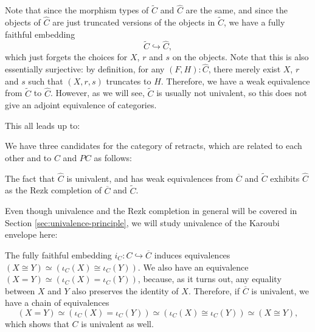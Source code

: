 \begin{remark}
  Note that since the morphism types of $ \tilde C $ and $ \hat C $ are the same, and since the objects of $ \hat C $ are just truncated versions of the objects in $ \tilde C $, we have a fully faithful embedding
  \[ \tilde C \hookrightarrow \hat C, \]
  which just forgets the choices for $ X $, $ r $ and $ s $ on the objects. Note that this is also essentially surjective: by definition, for any $ (F, H) : \hat C $, there merely exist $ X $, $ r $ and $ s $ such that $ (X, r, s) $ truncates to $ H $.
  Therefore, we have a weak equivalence from $ \tilde C $ to $ \hat C $. However, as we will see, $ \tilde C $ is usually not univalent, so this does not give an adjoint equivalence of categories.
\end{remark}

This all leads up to:
\begin{corollary}\label{cor:karoubi-candidates}
  We have three candidates for the category of retracts, which are related to each other and to $ C $ and $ PC $ as follows:
  \begin{center}
  \end{center}
  The fact that $ \hat C $ is univalent, and has weak equivalences from $ \overline C $ and $ \tilde C $ exhibits $ \hat C $ as the Rezk completion of $ \overline C $ and $ \tilde C $.
\end{corollary}

Even though univalence and the Rezk completion in general will be covered in Section \ref{sec:univalence-principle}, we will study univalence of the Karoubi envelope here:

\begin{remark}
  The fully faithful embedding $ i_C : C \hookrightarrow \overline C $ induces equivalences $ (X \cong Y) \simeq (\iota_C(X) \cong \iota_C(Y)) $. We also have an equivalence $ (X = Y) \simeq (\iota_C(X) = \iota_C(Y)) $, because, as it turns out, any equality between $ X $ and $ Y $ also preserves the identity of $ X $. Therefore, if $ \overline C $ is univalent, we have a chain of equivalences
  \[ (X = Y) \simeq (\iota_C(X) = \iota_C(Y)) \simeq (\iota_C(X) \cong \iota_C(Y)) \simeq (X \cong Y), \]
  which shows that $ C $ is univalent as well.
\end{remark}


